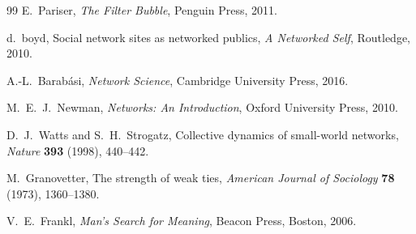 \documentclass{amsart}
\theoremstyle{plain}
\theoremstyle{definition}
\theoremstyle{remark}
\begin{document}
\begin{thebibliography}{99}
  E.\ Pariser,
  \textit{The Filter Bubble},
  Penguin Press, 2011.

  d.\ boyd,
  Social network sites as networked publics,
  \textit{A Networked Self}, Routledge, 2010.

  A.-L.\ Barab\'asi,
  \textit{Network Science},
  Cambridge University Press, 2016.

  M.\ E.\ J.\ Newman,
  \textit{Networks: An Introduction},
  Oxford University Press, 2010.

  D.\ J.\ Watts and S.\ H.\ Strogatz,
  Collective dynamics of small-world networks,
  \textit{Nature} \textbf{393} (1998), 440--442.

  M.\ Granovetter,
  The strength of weak ties,
  \textit{American Journal of Sociology} \textbf{78} (1973), 1360--1380.

  V.\ E.\ Frankl,
  \textit{Man's Search for Meaning},
  Beacon Press, Boston, 2006.

\end{thebibliography}
\end{document}
